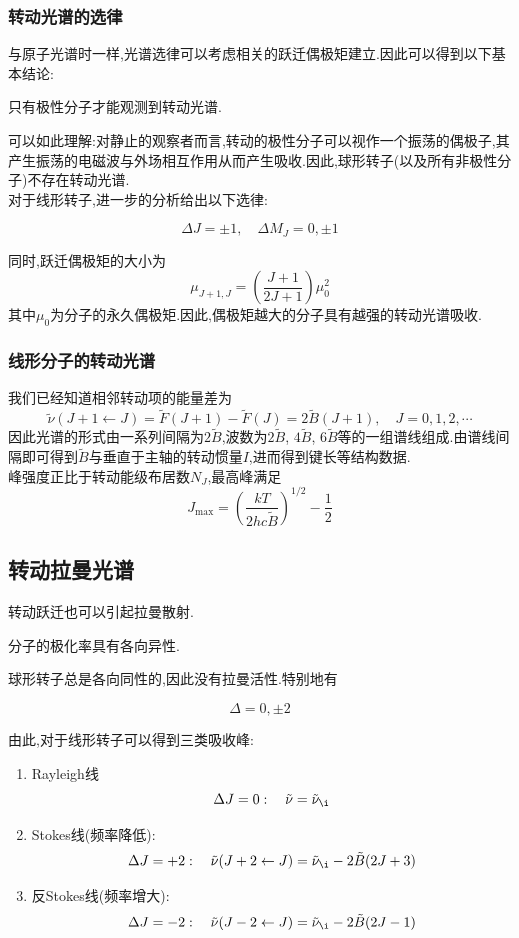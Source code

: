 \documentclass{ctexbook}
\begin{document}
\subsubsection{转动光谱的选律}
与原子光谱时一样,光谱选律可以考虑相关的跃迁偶极矩建立.因此可以得到以下基本结论:
\begin{theorem}[极性分子产生转动光谱]
    只有极性分子才能观测到转动光谱.
\end{theorem}
可以如此理解:对静止的观察者而言,转动的极性分子可以视作一个振荡的偶极子,其产生振荡的电磁波与外场相互作用从而产生吸收.因此,球形转子(以及所有非极性分子)不存在转动光谱.\\
\indent 对于线形转子,进一步的分析给出以下选律:
\begin{theorem}[线形分子的转动跃迁选律]
    \[\Delta J=\pm1,\quad\Delta M_J=0,\pm1\]
\end{theorem}
同时,跃迁偶极矩的大小为
\[\mu_{J+1,J}=\left(\dfrac{J+1}{2J+1}\right)\mu_0^2\]
其中$\mu_0$为分子的永久偶极矩.因此,偶极矩越大的分子具有越强的转动光谱吸收.
\subsubsection{线形分子的转动光谱}
我们已经知道相邻转动项的能量差为
\[\tilde{\nu}(J+1\leftarrow J)=\tilde{F}(J+1)-\tilde{F}(J)=2\tilde{B}(J+1),\quad J=0,1,2,\cdots\]
因此光谱的形式由一系列间隔为$2\tilde{B}$,波数为$2\tilde{B}$, $4\tilde{B}$, $6\tilde{B}$等的一组谱线组成.由谱线间隔即可得到$\tilde{B}$与垂直于主轴的转动惯量$I$,进而得到键长等结构数据.\\
\indent 峰强度正比于转动能级布居数$N_J$,最高峰满足
\[J_{\max}=\left(\dfrac{kT}{2hc\tilde{B}}\right)^{1/2}-\dfrac12\]
\subsection{转动拉曼光谱}
转动跃迁也可以引起拉曼散射.
\begin{theorem}[转动拉曼光谱的总选律]
    分子的极化率具有各向异性.
\end{theorem}
球形转子总是各向同性的,因此没有拉曼活性.特别地有
\begin{theorem}[线性转子的转动拉曼光谱的选律]
    \[\Delta=0,\pm2\]
\end{theorem}
由此,对于线形转子可以得到三类吸收峰:
\begin{enumerate}[label=\tbf{\alph*.}]
    \item Rayleigh线
    \[\Delta J=0:\quad\tilde{\nu}=\tilde{\nu}_{\i}\]
    \item Stokes线(频率降低):
    \[\Delta J=+2:\quad\tilde{\nu}(J+2\leftarrow J)=\tilde{\nu}_{\i}-2\tilde{B}(2J+3)\]
    \item 反Stokes线(频率增大):
    \[\Delta J=-2:\quad\tilde{\nu}(J-2\leftarrow J)=\tilde{\nu}_{\i}-2\tilde{B}(2J-1)\]
\end{enumerate}
\end{document}
